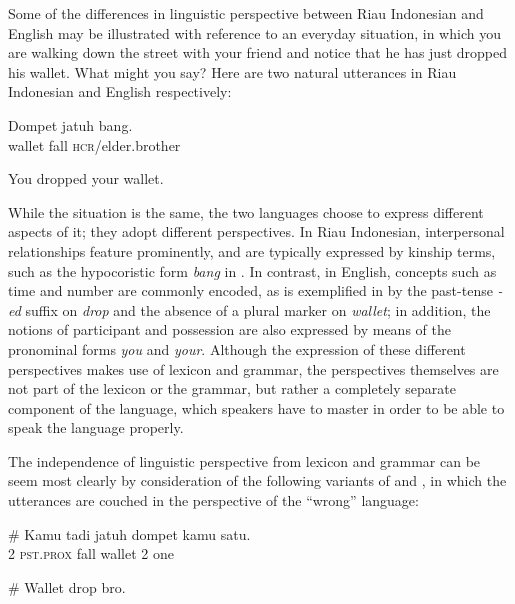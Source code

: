 \documentclass[output=paper,colorlinks,citecolor=brown
]{langscibook}
\begin{document}
Some of the differences in linguistic perspective between Riau Indonesian and English may be illustrated with reference to an everyday situation, in which you are walking down the street with your friend and notice that he has just dropped his wallet.  What might you say?  Here are two natural utterances in Riau Indonesian and English respectively:

\ea \label{ex:gil:5}
\gll Dompet	jatuh	bang. \\
    wallet	fall	\textsc{hcr}/elder.brother \\
\z

\ea \label{ex:gil:6}
You dropped your wallet. \\
\z

While the situation is the same, the two languages choose to express different aspects of it; they adopt different perspectives. In Riau Indonesian, interpersonal relationships feature prominently, and are typically expressed by kinship terms, such as the hypocoristic form \textit{bang} in .  In contrast, in English, concepts such as time and number are commonly encoded, as is exemplified in  by the past-tense \textit{-ed} suffix on \textit{drop} and the absence of a plural marker on \textit{wallet}; in addition, the notions of participant and possession are also expressed by means of the pronominal forms \textit{you} and \textit{your}. Although the expression of these different perspectives makes use of lexicon and grammar, the perspectives themselves are not part of the lexicon or the grammar, but rather a completely separate component of the language, which speakers have to master in order to be able to speak the language properly.  

The independence of linguistic perspective from lexicon and grammar can be seem most clearly by consideration of the following variants of  and , in which the utterances are couched in the perspective of the ``wrong'' language:

\ea \label{ex:gil:7}
\gll \# Kamu	tadi	jatuh	dompet	kamu	satu. \\
    { } 2	\textsc{pst.prox}	fall	wallet	2	one \\
\z

\ea \label{ex:gil:8}
\# Wallet drop bro. \\
\z
\end{document}
